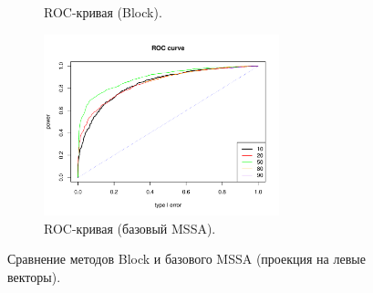 \documentclass[specialist,
substylefile = spbu_report.rtx,
subf,href,colorlinks=true, 12pt]{disser}
\theoremstyle{definition}
\begin{document}
\begin{figure}
\begin{subfigure}[t]{0.45\textwidth}
		\caption{ROC-кривая (Block).}
	\end{subfigure}\hspace{\fill}
	\begin{subfigure}[t]{0.45\textwidth}
		\centering
		\includegraphics[width=0.75\textwidth]{img/roc_mssa_ev.pdf}
		\caption{ROC-кривая (базовый MSSA).}
	\end{subfigure}
	\caption{Сравнение методов Block и базового MSSA (проекция на левые векторы).}
	\label{fig:block_ev}
\end{figure}
\end{document}
